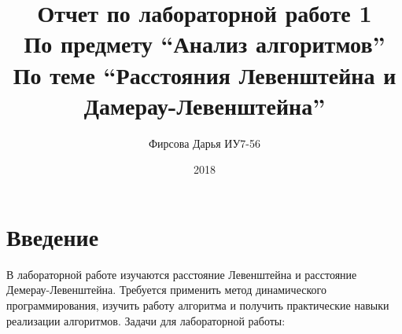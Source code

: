 \documentclass[12pt]{article}
\title{Отчет по лабораторной работе 1 \\ 
	По предмету “Анализ алгоритмов” \\
	По теме “Расстояния Левенштейна и Дамерау-Левенштейна”
}
\date{2018}
\author{Фирсова Дарья ИУ7-56}
\begin{document}
  
  \maketitle  
  \newpage
\section*{Введение}
В лабораторной работе изучаются расстояние Левенштейна и расстояние Демерау-Левенштейна. Требуется применить метод динамического программирования,  изучить работу алгоритма и получить практические навыки реализации алгоритмов. Задачи для лабораторной работы: 
\end{document}
